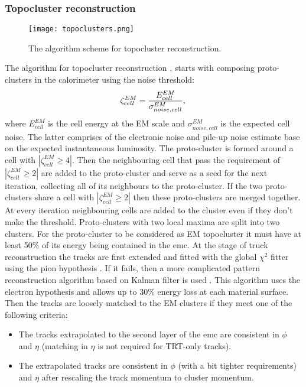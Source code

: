  	 \subsubsection{Topocluster reconstruction}
 	  	 	\label{sec::topocluster}
 	  	\begin{figure}[htbp]
 	 	\centering
 	 	\texttt{[image: topoclusters.png]}
 	 	\caption[topocluster]{The algorithm scheme for topocluster reconstruction.}
 	 	\label{fig::topocluster}
 	 \end{figure}
 	 The algorithm for topocluster reconstruction \cite{topoclust2_2016}, \cite{topoclust_2019} starts with composing proto-clusters in the calorimeter using the noise threshold:
 	 \begin{equation}
 	 	\zeta_{cell}^{EM} =\frac{E_{cell}^{EM}}{\sigma_{noise,cell}^{EM}},\\
 	 \end{equation}
 	 where $E_{cell}^{EM}$ is the cell energy at the EM scale and $\sigma_{noise,cell}^{EM}$ is the expected cell noise. The latter comprises of the electronic noise and pile-up noise estimate base on the expected instantaneous luminosity. The proto-cluster is formed around a cell with $|\zeta_{cell}^{EM} \ge 4|$. Then the neighbouring cell that pass the requirement of $|\zeta_{cell}^{EM} \ge 2 |$ are added to the proto-cluster and serve as a seed for the next iteration, collecting all of its neighbours to the proto-cluster. If the two proto-clusters share a cell with $|\zeta_{cell}^{EM} \ge 2|$ then these proto-clusters are merged together. At every iteration neighbouring cells are added to the cluster even if they don't make the threshold. Proto-clusters with two local maxima are split into two clusters. For the proto-cluster to be considered as EM topocluster it must have at least 50\% of its energy being contained in the \gls{emc}.
 	At the stage of truck reconstruction the tracks are first extended and fitted with the global $\chi^2$ fitter using the pion hypothesis \cite{Cornelissen:2008zza}. If it fails, then a more complicated pattern reconstruction algorithm based on Kalman filter is used \cite{Cornelissen:1020106}. This algorithm uses the electron hypothesis and allows up to 30\% energy loss at each material surface. Then the tracks are loosely matched to the EM clusters if they meet one of the following criteria:
 	\begin{itemize}
 		\item The tracks extrapolated to the second layer of the \gls{emc} are consistent in $\phi$ and $\eta$ (matching in $\eta$ is not required for TRT-only tracks). 
 		\item The extrapolated tracks are consistent in $\phi$ (with a bit tighter requirements) and $\eta$ after rescaling the track momentum to cluster momentum.
 	\end{itemize}
